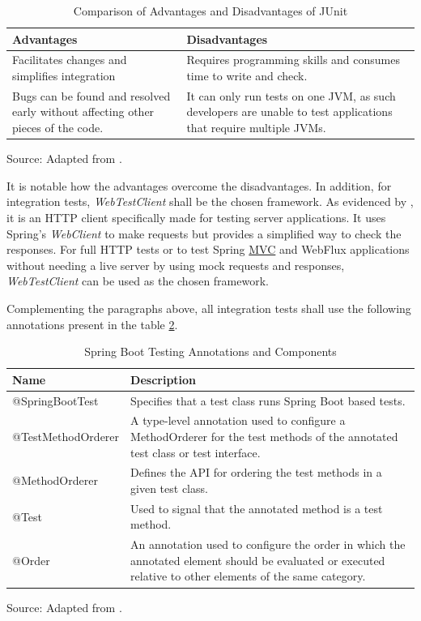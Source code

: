 \begin{table}[h]
    \centering
    \caption{Comparison of Advantages and Disadvantages of JUnit}
    \label{tab:junit_comparison_advantages_disadvantages}
    \begin{tabular}{p{} p{}}
        \hline
        \textbf{Advantages} & \textbf{Disadvantages} \\
        \hline
        Facilitates changes and simplifies integration & Requires programming skills and consumes time to write and check. \\
        \hline
        Bugs can be found and resolved early without affecting other pieces of the code. & It can only run tests on one JVM, as such developers are unable to test applications that require multiple JVMs. \\
        \hline
    \end{tabular}
    \footnotesize Source: Adapted from \cite{umar2019study}.
\end{table}

It is notable how the advantages overcome the disadvantages. In addition, 
for integration tests, \textit{WebTestClient} shall be the chosen framework. As evidenced by \cite{springboot_webtestclient_api}, it is an HTTP client specifically made for testing server applications. It uses Spring's \textit{WebClient} to make requests but provides a simplified way to check the responses. For full HTTP tests or to test Spring \hyperref[appendix:glossary]{MVC} and WebFlux applications without needing a live server by using mock requests and responses, \textit{WebTestClient} can be used as the chosen framework.

Complementing the paragraphs above, all integration tests shall use the following annotations present in the table \ref{table:integration_tests_annotations}.

\begin{table}[H]
\centering
\caption{Spring Boot Testing Annotations and Components}
\label{table:integration_tests_annotations}
\begin{tabular}{p{}p{}}
\toprule
\textbf{Name} & \textbf{Description} \\
\midrule
@SpringBootTest & Specifies that a test class runs Spring Boot based tests. \\ \hline
@TestMethodOrderer & A type-level annotation used to configure a MethodOrderer for the test methods of the annotated test class or test interface. \\ \hline
@MethodOrderer & Defines the API for ordering the test methods in a given test class. \\ \hline
@Test & Used to signal that the annotated method is a test method. \\ \hline
@Order & An annotation used to configure the order in which the annotated element should be evaluated or executed relative to other elements of the same category. \\
\bottomrule
\end{tabular}
\footnotesize Source: Adapted from \cite{junit5_methodorderer_api, junit5_order_api, junit5_test_api, junit5testmethodorder_api, springboottest_api}.
\end{table}

